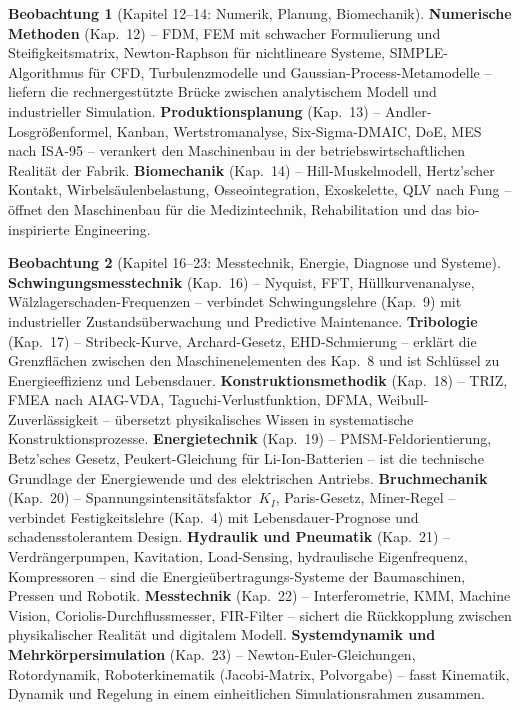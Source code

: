 ﻿\documentclass[a4paper,12pt]{report}
\theoremstyle{definition}
\newtheorem{beobachtung}{Beobachtung}
\begin{document}
\begin{beobachtung}[Kapitel 12--14: Numerik, Planung, Biomechanik]
\textbf{Numerische Methoden} (Kap.~12) -- FDM, FEM mit schwacher Formulierung
und Steifigkeitsmatrix, Newton-Raphson für nichtlineare Systeme,
SIMPLE-Algorithmus für CFD, Turbulenzmodelle und Gaussian-Process-Metamodelle --
liefern die rechnergestützte Brücke zwischen analytischem Modell und
industrieller Simulation.
\textbf{Produktionsplanung} (Kap.~13) -- Andler-Losgrößenformel, Kanban,
Wertstromanalyse, Six-Sigma-DMAIC, DoE, MES nach ISA-95 -- verankert
den Maschinenbau in der betriebswirtschaftlichen Realität der Fabrik.
\textbf{Biomechanik} (Kap.~14) -- Hill-Muskelmodell, Hertz'scher Kontakt,
Wirbelsäulenbelastung, Osseointegration, Exoskelette, QLV nach Fung --
öffnet den Maschinenbau für die Medizintechnik, Rehabilitation und
das bio-inspirierte Engineering.
\end{beobachtung}

\begin{beobachtung}[Kapitel 16--23: Messtechnik, Energie, Diagnose und Systeme]
\textbf{Schwingungsmesstechnik} (Kap.~16) -- Nyquist, FFT, Hüllkurvenanalyse,
Wälzlagerschaden-Frequenzen -- verbindet Schwingungslehre (Kap.~9)
mit industrieller Zustandsüberwachung und Predictive Maintenance.
\textbf{Tribologie} (Kap.~17) -- Stribeck-Kurve, Archard-Gesetz, EHD-Schmierung --
erklärt die Grenzflächen zwischen den Maschinenelementen des Kap.~8
und ist Schlüssel zu Energieeffizienz und Lebensdauer.
\textbf{Konstruktionsmethodik} (Kap.~18) -- TRIZ, FMEA nach AIAG-VDA,
Taguchi-Verlustfunktion, DFMA, Weibull-Zuverlässigkeit -- übersetzt
physikalisches Wissen in systematische Konstruktionsprozesse.
\textbf{Energietechnik} (Kap.~19) -- PMSM-Feldorientierung, Betz'sches Gesetz,
Peukert-Gleichung für Li-Ion-Batterien -- ist die technische Grundlage
der Energiewende und des elektrischen Antriebs.
\textbf{Bruchmechanik} (Kap.~20) -- Spannungsintensitätsfaktor~$K_I$,
Paris-Gesetz, Miner-Regel -- verbindet Festigkeitslehre (Kap.~4)
mit Lebensdauer-Prognose und schadensstolerantem Design.
\textbf{Hydraulik und Pneumatik} (Kap.~21) -- Verdrängerpumpen, Kavitation,
Load-Sensing, hydraulische Eigenfrequenz, Kompressoren -- sind die
Energieübertragungs-Systeme der Baumaschinen, Pressen und Robotik.
\textbf{Messtechnik} (Kap.~22) -- Interferometrie, KMM, Machine Vision,
Coriolis-Durchflussmesser, FIR-Filter -- sichert die Rückkopplung
zwischen physikalischer Realität und digitalem Modell.
\textbf{Systemdynamik und Mehrkörpersimulation} (Kap.~23) -- Newton-Euler-Gleichungen,
Rotordynamik, Roboterkinematik (Jacobi-Matrix, Polvorgabe) -- fasst
Kinematik, Dynamik und Regelung in einem einheitlichen Simulationsrahmen zusammen.
\end{beobachtung}
\end{document}
